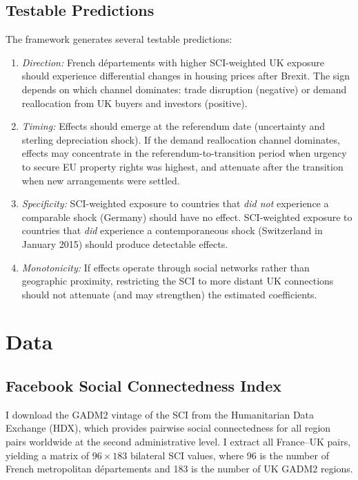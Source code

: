 \documentclass[12pt]{article}
\begin{document}
\subsection{Testable Predictions}

The framework generates several testable predictions:

\begin{enumerate}
\item \textit{Direction:} French d\'epartements with higher SCI-weighted UK exposure should experience differential changes in housing prices after Brexit. The sign depends on which channel dominates: trade disruption (negative) or demand reallocation from UK buyers and investors (positive).
\item \textit{Timing:} Effects should emerge at the referendum date (uncertainty and sterling depreciation shock). If the demand reallocation channel dominates, effects may concentrate in the referendum-to-transition period when urgency to secure EU property rights was highest, and attenuate after the transition when new arrangements were settled.
\item \textit{Specificity:} SCI-weighted exposure to countries that \textit{did not} experience a comparable shock (Germany) should have no effect. SCI-weighted exposure to countries that \textit{did} experience a contemporaneous shock (Switzerland in January 2015) should produce detectable effects.
\item \textit{Monotonicity:} If effects operate through social networks rather than geographic proximity, restricting the SCI to more distant UK connections should not attenuate (and may strengthen) the estimated coefficients.
\end{enumerate}


\section{Data}

\subsection{Facebook Social Connectedness Index}

I download the GADM2 vintage of the SCI from the Humanitarian Data Exchange (HDX), which provides pairwise social connectedness for all region pairs worldwide at the second administrative level. I extract all France--UK pairs, yielding a matrix of $96 \times 183$ bilateral SCI values, where 96 is the number of French metropolitan d\'epartements and 183 is the number of UK GADM2 regions.
\end{document}
